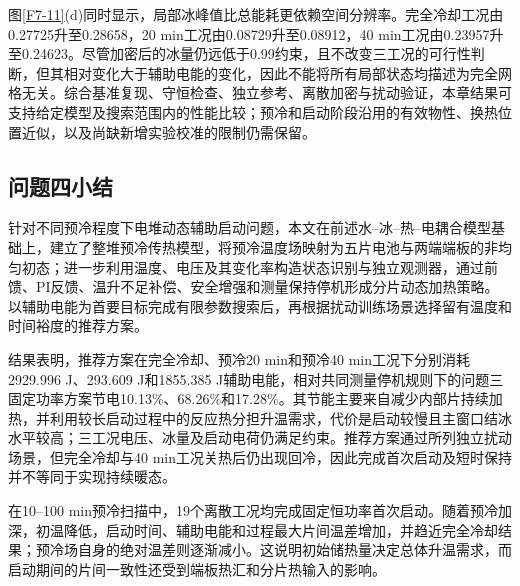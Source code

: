 \documentclass[bwprint]{gmcmthesis}
\numberwithin{figure}{section}
\begin{document}
图\ref{F7-11}(d)同时显示，局部冰峰值比总能耗更依赖空间分辨率。完全冷却工况由0.27725升至0.28658，20 min工况由0.08729升至0.08912，40 min工况由0.23957升至0.24623。尽管加密后的冰量仍远低于0.99约束，且不改变三工况的可行性判断，但其相对变化大于辅助电能的变化，因此不能将所有局部状态均描述为完全网格无关。综合基准复现、守恒检查、独立参考、离散加密与扰动验证，本章结果可支持给定模型及搜索范围内的性能比较；预冷和启动阶段沿用的有效物性、换热位置近似，以及尚缺新增实验校准的限制仍需保留。

\subsection{问题四小结}

针对不同预冷程度下电堆动态辅助启动问题，本文在前述水--冰--热--电耦合模型基础上，建立了整堆预冷传热模型，将预冷温度场映射为五片电池与两端端板的非均匀初态；进一步利用温度、电压及其变化率构造状态识别与独立观测器，通过前馈、PI反馈、温升不足补偿、安全增强和测量保持停机形成分片动态加热策略。以辅助电能为首要目标完成有限参数搜索后，再根据扰动训练场景选择留有温度和时间裕度的推荐方案。

结果表明，推荐方案在完全冷却、预冷20 min和预冷40 min工况下分别消耗2929.996 J、293.609 J和1855.385 J辅助电能，相对共同测量停机规则下的问题三固定功率方案节电10.13\%、68.26\%和17.28\%。其节能主要来自减少内部片持续加热，并利用较长启动过程中的反应热分担升温需求，代价是启动较慢且主窗口结冰水平较高；三工况电压、冰量及启动电荷仍满足约束。推荐方案通过所列独立扰动场景，但完全冷却与40 min工况关热后仍出现回冷，因此完成首次启动及短时保持并不等同于实现持续暖态。

在10--100 min预冷扫描中，19个离散工况均完成固定恒功率首次启动。随着预冷加深，初温降低，启动时间、辅助电能和过程最大片间温差增加，并趋近完全冷却结果；预冷场自身的绝对温差则逐渐减小。这说明初始储热量决定总体升温需求，而启动期间的片间一致性还受到端板热汇和分片热输入的影响。

\end{document}

